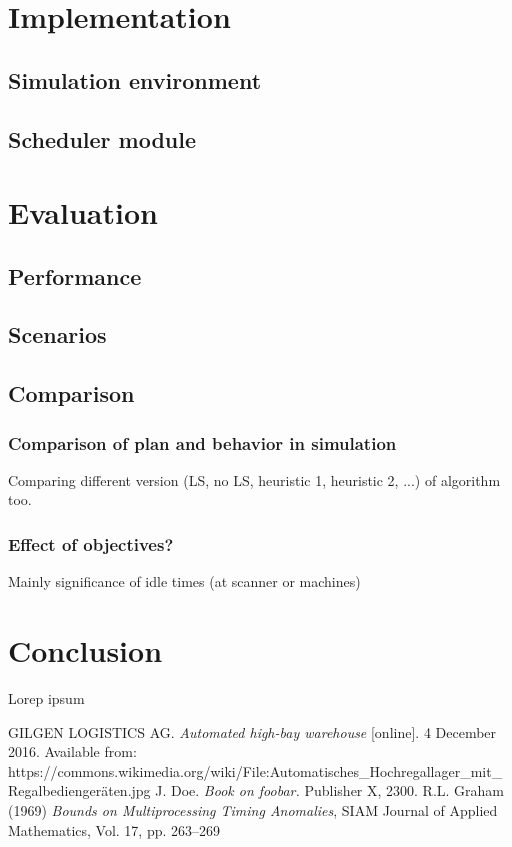 \documentclass{ctuthesis}
\begin{document}
\chapter{Implementation}
\section{Simulation environment}
\section{Scheduler module}
\chapter{Evaluation}
\label{ch:Evaluation}
\section{Performance}
\section{Scenarios}
\section{Comparison}
\subsection{Comparison of plan and behavior in simulation}
Comparing different version (LS, no LS, heuristic 1, heuristic 2, ...) of algorithm too.
\subsection{Effect of objectives?}
Mainly significance of idle times (at scanner or machines)
\chapter{Conclusion}

Lorep ipsum \cite{doe}

\begin{thebibliography}{1}
 GILGEN LOGISTICS AG. \emph{Automated high-bay warehouse} [online]. 4 December 2016. Available from: https://commons.wikimedia.org/wiki/File:Automatisches\_Hochregallager\_mit\_Regalbediengeräten.jpg
 J. Doe. \emph{Book on foobar.} Publisher X,
 2300.
  R.L. Graham (1969) \emph{Bounds on Multiprocessing Timing Anomalies}, SIAM
Journal of Applied Mathematics, Vol. 17, pp. 263–269

\end{thebibliography}
\end{document}
